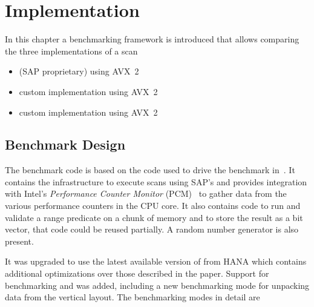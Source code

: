 \chapter{Implementation}
\label{chapter:implementation}

In this chapter a benchmarking framework is introduced that allows comparing the
three implementations of a scan

\begin{itemize}
  \item \simdscan{} (SAP proprietary) using AVX~2
  \item \bwv{} custom implementation using AVX~2
  \item \bs{} custom implementation using AVX~2
\end{itemize}

\section{Benchmark Design}

The benchmark code is based on the code used to drive the benchmark
in~\cite{AVX2-Scan}. It contains the infrastructure to execute scans using
SAP's \simdscan{} and provides integration with Intel's \emph{Performance
Counter Monitor} (PCM)~\cite{intelpcm} to gather data from the various
performance counters in the CPU core. It also contains code to run and validate
a range predicate on a chunk of memory and to store the result as a bit vector,
that code could be reused partially. A random number generator is also present.

It was upgraded to use the latest available version of \simdscan{} from HANA
which contains additional optimizations over those described in the paper.
Support for benchmarking \bwv{} and \bs{} was added, including a new
benchmarking mode for unpacking data from the vertical layout. The benchmarking
modes in detail are

